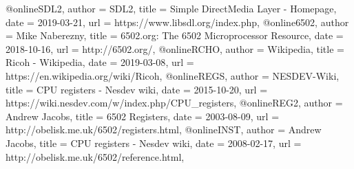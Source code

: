@online{SDL2,
	author = {SDL2},
	title = {Simple DirectMedia Layer - Homepage},
	date = {2019-03-21},
	url = {https://www.libsdl.org/index.php},
}
@online{6502,
	author = {Mike Naberezny},
	title = {6502.org: The 6502 Microprocessor Resource},
	date = {2018-10-16},
	url = {http://6502.org/},
}
@online{RCHO,
	author = {Wikipedia},
	title = {Ricoh - Wikipedia},
	date = {2019-03-08},
	url = {https://en.wikipedia.org/wiki/Ricoh},
}
@online{REGS,
	author = {NESDEV-Wiki},
	title = {CPU registers - Nesdev wiki},
	date = {2015-10-20},
	url = {https://wiki.nesdev.com/w/index.php/CPU_registers},
}
@online{REG2,
	author = {Andrew Jacobs},
	title = {6502 Registers},
	date = {2003-08-09},
	url = {http://obelisk.me.uk/6502/registers.html},
}
@online{INST,
	author = {Andrew Jacobs},
	title = {CPU registers - Nesdev wiki},
	date = {2008-02-17},
	url = {http://obelisk.me.uk/6502/reference.html},
}

